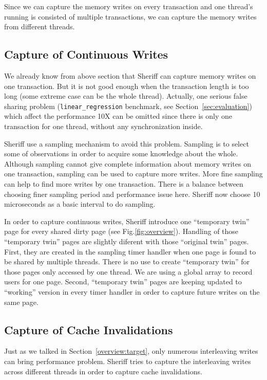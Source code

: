 Since we can capture the memory writes on every transaction and one thread's running is consisted of multiple transactions, 
we can capture the memory writes from different threads.

\subsection{Capture of Continuous Writes}
\label{detection:sampling}
We already know from above section that Sheriff can capture memory writes on one transaction. 
But it is not good enough when the transaction length is too long (some extreme case can be the whole thread). 
Actually, one serious false sharing problem (\texttt{linear\_regression} benchmark, see Section~\ref{sec:evaluation}) 
which affect the performance 10X can be omitted since there is only one transaction for one thread, 
without any synchronization inside. 

Sheriff use a sampling mechanism to avoid this problem. Sampling is 
to select some of observations in order to acquire some knowledge about the whole.
Although sampling cannot give complete information about memory writes on one transaction,
sampling can be used to capture more writes. More fine sampling can help to find more writes by one transaction.
There is a balance between choosing finer sampling period and performance issue here. 
Sheriff now choose 10 microseconds as a basic interval to do sampling. 

In order to capture continuous writes, Sheriff introduce one ``temporary twin'' page for every shared dirty page
 (see Fig.\ref{fig:overview}). 
Handling of those ``temporary twin'' pages are slightly diferent with those ``original twin'' pages.
First, they are created in the sampling timer handler when one page is found to be shared by multiple threads. 
There is no use to create ``temporary twin'' for those pages only accessed by one thread. We are using a global array to
record users for one page. 
Second, ``temporary twin'' pages are keeping updated to ``working'' version in every timer handler 
in order to capture future writes on the same page.
 
\subsection{Capture of Cache Invalidations}
\label{detection:invalidation}
Just as we talked in Section~\ref{overview:target}, only numerous interleaving writes can bring performance problem. 
Sheriff tries to capture the interleaving writes across different threads in order to capture 
cache invalidations. 

